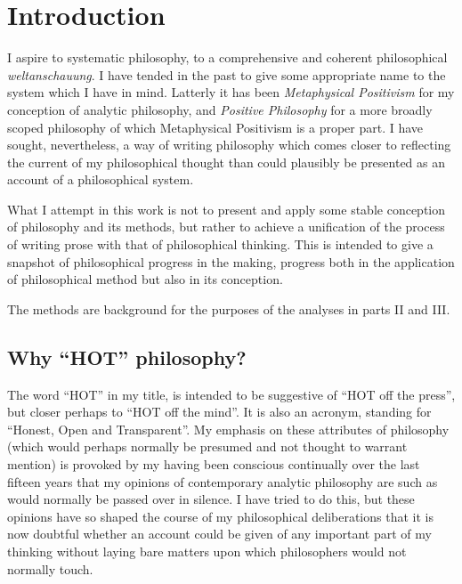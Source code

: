 
\def\rbjidintro{$$Id: intro.tex,v 1.2 2010/02/01 11:34:11 rbj Exp $$}

\chapter{Introduction}\label{Introduction}

I aspire to systematic philosophy, to a comprehensive and coherent philosophical \emph{weltanschauung}.
I have tended in the past to give some appropriate name to the system which I have in mind.
Latterly it has been {\it Metaphysical Positivism} for my conception of analytic philosophy, and {\it Positive Philosophy} for a more broadly scoped philosophy of which Metaphysical Positivism is a proper part.
I have sought, nevertheless, a way of writing philosophy which comes closer to reflecting the current of my philosophical thought than could plausibly be presented as an account of a philosophical system.

What I attempt in this work is not to present and apply some stable conception of philosophy and its methods, but rather to achieve a unification of the process of writing prose with that of philosophical thinking.
This is intended to give a snapshot of philosophical progress in the making, progress both in the application of philosophical method but also in its conception.

The methods are background for the purposes of the analyses in parts II and III.


\section{Why ``HOT'' philosophy?}

The word ``HOT'' in my title, is intended to be suggestive of ``HOT off the press'', but closer perhaps to ``HOT off the mind''.
It is also an acronym, standing for ``Honest, Open and Transparent''.
My emphasis on these attributes of philosophy (which would perhaps normally be presumed and not thought to warrant mention) is provoked by my having been conscious continually over the last fifteen years that my opinions of contemporary analytic philosophy are such as would normally be passed over in silence.
I have tried to do this, but these opinions have so shaped the course of my philosophical deliberations that it is now doubtful whether an account could be given of any important part of my thinking without laying bare matters upon which philosophers would not normally touch.

